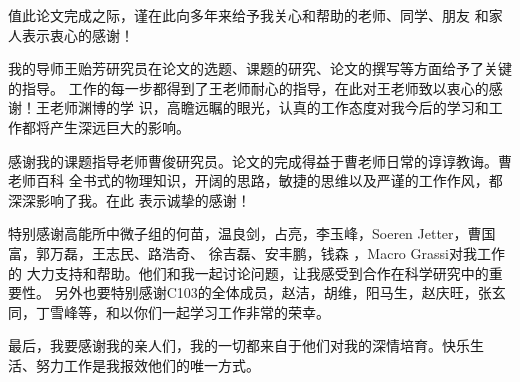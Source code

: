 \begin{thanks}
值此论文完成之际，谨在此向多年来给予我关心和帮助的老师、同学、朋友
和家人表示衷心的感谢！

我的导师王贻芳研究员在论文的选题、课题的研究、论文的撰写等方面给予了关键的指导。
工作的每一步都得到了王老师耐心的指导，在此对王老师致以衷心的感谢！王老师渊博的学
识，高瞻远瞩的眼光，认真的工作态度对我今后的学习和工作都将产生深远巨大的影响。


感谢我的课题指导老师曹俊研究员。论文的完成得益于曹老师日常的谆谆教诲。曹老师百科
全书式的物理知识，开阔的思路，敏捷的思维以及严谨的工作作风，都深深影响了我。在此
表示诚挚的感谢！

特别感谢高能所中微子组的何苗，温良剑，占亮，李玉峰，Soeren Jetter，曹国富，郭万磊，王志民、路浩奇、
徐吉磊、安丰鹏，钱森 ，Macro Grassi对我工作的
大力支持和帮助。他们和我一起讨论问题，让我感受到合作在科学研究中的重要性。
另外也要特别感谢C103的全体成员，赵洁，胡维，阳马生，赵庆旺，张玄同，丁雪峰等，和以你们一起学习工作非常的荣幸。


最后，我要感谢我的亲人们，我的一切都来自于他们对我的深情培育。快乐生
活、努力工作是我报效他们的唯一方式。

\end{thanks}
